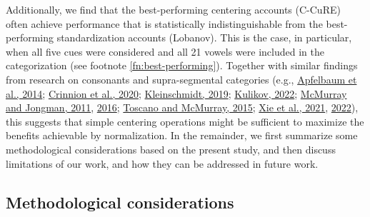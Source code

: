 \documentclass[utf8]{frontiersSCNS}
\begin{document}
Additionally, we find that the best-performing centering accounts (C-CuRE) often achieve performance that is statistically indistinguishable from the best-performing standardization accounts (Lobanov). This is the case, in particular, when all five cues were considered and all 21 vowels were included in the categorization (see footnote \ref{fn:best-performing}). Together with similar findings from research on consonants and supra-segmental categories (e.g., \protect\hyperlink{ref-apfelbaum2014}{Apfelbaum et al., 2014}; \protect\hyperlink{ref-crinnion2020}{Crinnion et al., 2020}; \protect\hyperlink{ref-kleinschmidt2019}{Kleinschmidt, 2019}; \protect\hyperlink{ref-kulikov2022}{Kulikov, 2022}; \protect\hyperlink{ref-mcmurray-jongman2011}{McMurray and Jongman, 2011}, \protect\hyperlink{ref-mcmurray-jongman2016}{2016}; \protect\hyperlink{ref-toscano2015}{Toscano and McMurray, 2015}; \protect\hyperlink{ref-xie2021cognition}{Xie et al., 2021}, \protect\hyperlink{ref-xie2022}{2022}), this suggests that simple centering operations might be sufficient to maximize the benefits achievable by normalization. In the remainder, we first summarize some methodological considerations based on the present study, and then discuss limitations of our work, and how they can be addressed in future work.

\hypertarget{sec:methods-disc}{%
\subsection*{Methodological considerations}\label{sec:methods-disc}}
\end{document}
